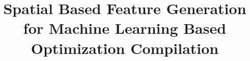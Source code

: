\documentclass[conference]{IEEEtran}
\begin{document}
%
\title{Spatial Based Feature Generation for Machine Learning Based Optimization Compilation}


\author{
}


%








\maketitle
\end{document}
